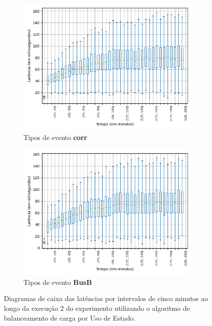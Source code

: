 \begin{figure}
\begin{subfigure}{.5\textwidth}
\centering
\includegraphics[width=\textwidth]{figuras/graphics/boxplot_7-dez-su_corr.png}
\caption{Tipos de evento \textbf{corr}}
\label{fig:BoxPlot_corr_SU_7-dez-su}
\end{subfigure}%
\begin{subfigure}{.5\textwidth}
\centering
\includegraphics[width=\textwidth]{figuras/graphics/boxplot_7-dez-su_busb.png}
\caption{Tipos de evento \textbf{BusB}}
\label{fig:BoxPlot_BusB_SU_7-dez-su}
\end{subfigure}%
\caption{Diagramas de caixa das latências por intervalos de cinco minutos ao longo da execução 2 do experimento utilizando o algoritmo de balanceamento de carga por Uso de Estado.}
\end{figure}






